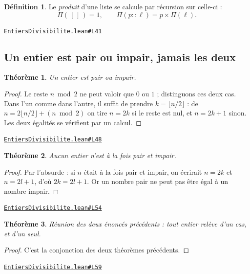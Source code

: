 \documentclass[11pt,a4paper]{article}
\theoremstyle{definition}
\newtheorem{definition}{Définition}
\theoremstyle{plain}
\newtheorem{theoreme}{Théorème}
\newcommand{\source}[2]{\par\smallskip\noindent\hfill{\footnotesize\href{#1}{\texttt{#2}}}\par\smallskip}
\begin{document}
\begin{definition}
Le \emph{produit} d'une liste se calcule par récursion sur celle-ci :
\[ \Pi(\,[\,]\,) = 1, \qquad \Pi(p :: \ell) = p \times \Pi(\ell) . \]
\end{definition}
\source{https://github.com/Commutator-IO/learn-lean/blob/main/cours/01-college/01-nombres-et-calculs/EntiersDivisibilite.lean\#L41}{EntiersDivisibilite.lean\#L41}

\subsection{Un entier est pair ou impair, jamais les deux}

\begin{theoreme}
Un entier est pair ou impair.
\end{theoreme}

\begin{proof}
Le reste $n \bmod 2$ ne peut valoir que $0$ ou $1$ ; distinguons ces deux cas. Dans
l'un comme dans l'autre, il suffit de prendre $k = \lfloor n/2 \rfloor$ : de
$n = 2\lfloor n/2 \rfloor + (n \bmod 2)$ on tire $n = 2k$ si le reste est nul, et
$n = 2k + 1$ sinon. Les deux égalités se vérifient par un calcul.
\end{proof}
\source{https://github.com/Commutator-IO/learn-lean/blob/main/cours/01-college/01-nombres-et-calculs/EntiersDivisibilite.lean\#L48}{EntiersDivisibilite.lean\#L48}

\begin{theoreme}
Aucun entier n'est à la fois pair et impair.
\end{theoreme}

\begin{proof}
Par l'absurde : si $n$ était à la fois pair et impair, on écrirait $n = 2k$ et
$n = 2l + 1$, d'où $2k = 2l + 1$. Or un nombre pair ne peut pas être égal à un nombre
impair.
\end{proof}
\source{https://github.com/Commutator-IO/learn-lean/blob/main/cours/01-college/01-nombres-et-calculs/EntiersDivisibilite.lean\#L54}{EntiersDivisibilite.lean\#L54}

\begin{theoreme}
Réunion des deux énoncés précédents : tout entier relève d'un cas, et d'un seul.
\end{theoreme}

\begin{proof}
C'est la conjonction des deux théorèmes précédents.
\end{proof}
\source{https://github.com/Commutator-IO/learn-lean/blob/main/cours/01-college/01-nombres-et-calculs/EntiersDivisibilite.lean\#L59}{EntiersDivisibilite.lean\#L59}
\end{document}
